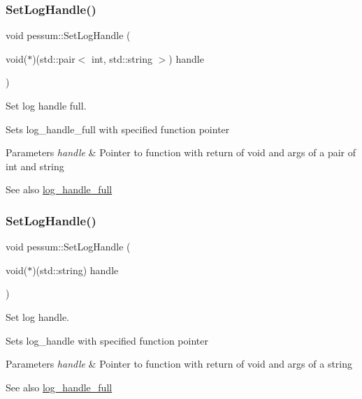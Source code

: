 \subsubsection{\texorpdfstring{Set\+Log\+Handle()}{SetLogHandle()}\hspace{0.1cm}{\footnotesize\ttfamily [1/2]}}
{\footnotesize\ttfamily void pessum\+::\+Set\+Log\+Handle (\begin{DoxyParamCaption}\item[{void($\ast$)(std\+::pair$<$ int, std\+::string $>$)}]{handle }\end{DoxyParamCaption})}



Set log handle full. 

Sets log\+\_\+handle\+\_\+full with specified function pointer 
\begin{DoxyParams}{Parameters}
{\em handle} & Pointer to function with return of void and args of a pair of int and string \\
\hline
\end{DoxyParams}
\begin{DoxySeeAlso}{See also}
\hyperlink{namespacepessum_abf1b472e1b61a337c584d96eb9789f8e}{log\+\_\+handle\+\_\+full} 
\end{DoxySeeAlso}
\mbox{\label{namespacepessum_ab20026ac5dd6e6014097f8792679a2df}} 
\subsubsection{\texorpdfstring{Set\+Log\+Handle()}{SetLogHandle()}\hspace{0.1cm}{\footnotesize\ttfamily [2/2]}}
{\footnotesize\ttfamily void pessum\+::\+Set\+Log\+Handle (\begin{DoxyParamCaption}\item[{void($\ast$)(std\+::string)}]{handle }\end{DoxyParamCaption})}



Set log handle. 

Sets log\+\_\+handle with specified function pointer 
\begin{DoxyParams}{Parameters}
{\em handle} & Pointer to function with return of void and args of a string \\
\hline
\end{DoxyParams}
\begin{DoxySeeAlso}{See also}
\hyperlink{namespacepessum_abf1b472e1b61a337c584d96eb9789f8e}{log\+\_\+handle\+\_\+full} 
\end{DoxySeeAlso}
\mbox{\label{namespacepessum_a32367e906bdf84c0942a5e4a3588b255}} 
